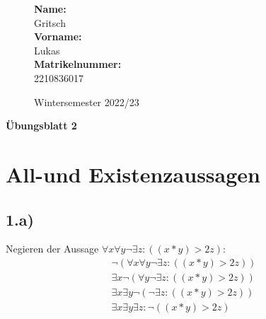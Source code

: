 \documentclass[10pt,ngerman]{scrartcl}
\begin{document}
\begin{figure}[htbp]
\begin{minipage}[b]{0.50\linewidth}
\begin{Large}

	\textbf{Name:}\\
	Gritsch 			\\
	\textbf{Vorname:}\\
	Lukas 				\\
	\textbf{Matrikelnummer:}\\
	2210836017

\end{Large}
\end{minipage}
\begin{minipage}[b]{0.50\linewidth}
\begin{flushright}
\begin{Huge}
\end{Huge}
\vspace{10px}
\begin{large}
Wintersemester 2022/23
\end{large}
\end{flushright}
\end{minipage}
\end{figure}

\vspace{20px}
\begin{huge}
\noindent

\textbf{Übungsblatt 2}
\end{huge}

\pagebreak
\section{All-und Existenzaussagen}
\subsection{1.a)}
Negieren der Aussage $\forall x \forall y \neg \exists z : ((x*y) > 2z)$:
\setcounter{equation}{0}
\begin{align}
\neg(\forall x \forall y \neg \exists z : ((x*y) > 2z))\\
\exists x \neg(\forall y \neg \exists z : ((x*y) > 2z))\\
\exists x \exists y \neg (\neg \exists z : ((x*y) > 2z))\\
\exists x \exists y \exists z : \neg ((x*y) > 2z)
\end{align}
\end{document}
